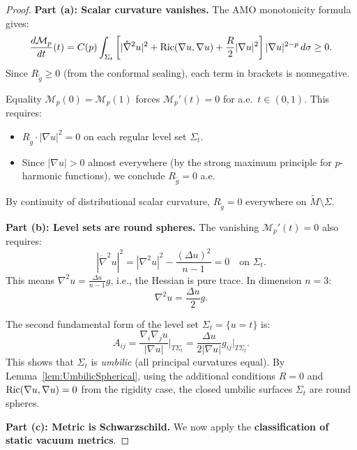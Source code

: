 \begin{proof}
\textbf{Part (a): Scalar curvature vanishes.}
The AMO monotonicity formula gives:
\begin{equation}
    \frac{d\mathcal{M}_p}{dt}(t) = C(p) \int_{\Sigma_t} \left[ |\mathring{\nabla}^2 u|^2 + \mathrm{Ric}(\nabla u, \nabla u) + \frac{R}{2}|\nabla u|^2 \right] |\nabla u|^{2-p} \, d\sigma \ge 0.
\end{equation}
Since $R_{\tilde{g}} \ge 0$ (from the conformal sealing), each term in brackets is nonnegative.

Equality $\mathcal{M}_p(0) = \mathcal{M}_p(1)$ forces $\mathcal{M}_p'(t) = 0$ for a.e.\ $t \in (0,1)$. This requires:
\begin{itemize}
    \item $R_{\tilde{g}} \cdot |\nabla u|^2 = 0$ on each regular level set $\Sigma_t$.
    \item Since $|\nabla u| > 0$ almost everywhere (by the strong maximum principle for $p$-harmonic functions), we conclude $R_{\tilde{g}} = 0$ a.e.
\end{itemize}
By continuity of distributional scalar curvature, $R_{\tilde{g}} = 0$ everywhere on $\tilde{M} \setminus \Sigma$.

\textbf{Part (b): Level sets are round spheres.}
The vanishing $\mathcal{M}_p'(t) = 0$ also requires:
\begin{equation}
    |\mathring{\nabla}^2 u|^2 = |\nabla^2 u|^2 - \frac{(\Delta u)^2}{n-1} = 0 \quad \text{on } \Sigma_t.
\end{equation}
This means $\nabla^2 u = \frac{\Delta u}{n-1} g$, i.e., the Hessian is pure trace. In dimension $n = 3$:
\begin{equation}
    \nabla^2 u = \frac{\Delta u}{2} g.
\end{equation}

The second fundamental form of the level set $\Sigma_t = \{u = t\}$ is:
\begin{equation}
    A_{ij} = \frac{\nabla_i \nabla_j u}{|\nabla u|} \Big|_{T\Sigma_t} = \frac{\Delta u}{2|\nabla u|} g_{ij} \Big|_{T\Sigma_t}.
\end{equation}
This shows that $\Sigma_t$ is \emph{umbilic} (all principal curvatures equal). By Lemma~\ref{lem:UmbilicSpherical}, using the additional conditions $R = 0$ and $\mathrm{Ric}(\nabla u, \nabla u) = 0$ from the rigidity case, the closed umbilic surfaces $\Sigma_t$ are round spheres.

\textbf{Part (c): Metric is Schwarzschild.}
We now apply the \textbf{classification of static vacuum metrics}.


\end{proof}
